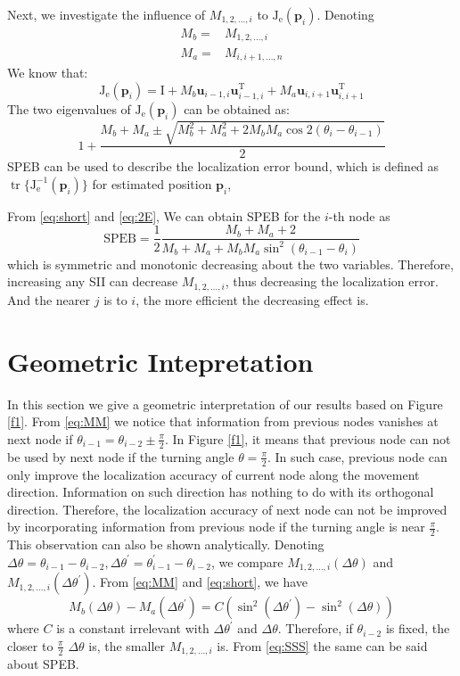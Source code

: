 \documentclass[conference]{IEEEtran}
\DeclareMathOperator\tr{tr}
\begin{document}
Next, we investigate the influence of $M_{1,2,\dots,i}$ to $\bm{\mathrm{J}}_{\mathrm{e}}(\bm{p}_i)$.
Denoting 
\begin{align}\label{eq:short}
M_{b}=&M_{1,2,\dots,i}\nonumber\\
M_{a}=&M_{i,i+1,\dots,n}
\end{align}
We know that:
\[
\bm{\mathrm{J}}_{\mathrm{e}}(\bm{p}_i)=\bm{\mathrm{I}}+M_{b}\bm{u}_{i-1,i}\bm{u}_{i-1,i}^{\mathrm{T}}+M_{a}\bm{u}_{i,i+1}\bm{u}_{i,i+1}^{\mathrm{T}}
\]
The two eigenvalues of $\bm{\mathrm{J}}_{\mathrm{e}}(\bm{p}_i)$ can be obtained as:
\begin{equation}\label{eq:2E}
1+\frac{M_{b}+M_{a}\pm \sqrt{M_{b}^2+M_{a}^2+2M_{b}M_{a}\cos2(\theta_i-\theta_{i-1})}}{2}
\end{equation}
SPEB can be used to describe the localization error bound, which is defined as $\tr\{\bm{\mathrm{J}}_{\mathrm{e}}^{-1}(\bm{p}_i)\} $ for estimated position $\bm{p}_i$,

From \eqref{eq:short} and \eqref{eq:2E},
We can obtain SPEB for the $i$-th node as
\begin{equation}\label{eq:SSS}
\text{SPEB}=\frac{1}{2}\frac{M_{b}+M_{a}+2}{M_{b}+M_{a}+M_{b}M_{a}\sin^2(\theta_{i-1}-\theta_{i})}
\end{equation}
which is symmetric and monotonic decreasing about the two variables.
Therefore, increasing any SII can decrease $M_{1,2,\dots,i}$, thus decreasing the localization error. And the nearer $j$ is to $i$, the more efficient the decreasing effect is. 
\section{Geometric Intepretation}\label{geometry}
In this section we give a geometric interpretation of our results based on Figure \ref{f1}.
From \eqref{eq:MM} we notice that information from previous nodes vanishes at next node 
if $\theta_{i-1}=\theta_{i-2}\pm\frac{\pi}{2}$.
In Figure \ref{f1}, it means that previous node can not be used by next node if the turning angle $\theta=\frac{\pi}{2}$.
In such case, previous node can only improve the localization accuracy of current node along the movement direction. 
Information on such direction has nothing to do with its orthogonal direction. 
Therefore, the localization accuracy of next node can not be improved by incorporating information 
from previous node if the turning angle is near $\frac{\pi}{2}$. 
This observation can also be shown analytically. Denoting $\Delta \theta=\theta_{i-1}-\theta_{i-2},\Delta \theta^{\prime}=\theta_{i-1}^{\prime}-\theta_{i-2}$, 
we compare $M_{1,2,\dots,i}(\Delta \theta)$ and $M_{1,2,\dots,i}(\Delta \theta^{\prime})$. 
From \eqref{eq:MM} and \eqref{eq:short}, we have
\begin{equation}
M_{b}(\Delta \theta)-M_{a}(\Delta \theta^{\prime})=C (\sin^2(\Delta \theta^{\prime})-\sin^2(\Delta \theta))\end{equation}
where $C$ is a constant irrelevant with $\Delta \theta^{\prime}$ and $\Delta \theta$.
Therefore, if $\theta_{i-2}$ is fixed, the closer to $\frac{\pi}{2}$ $\Delta \theta$ is, the smaller $M_{1,2,\dots,i}$ is.
From \eqref{eq:SSS} the same can be said about SPEB.
\end{document}
